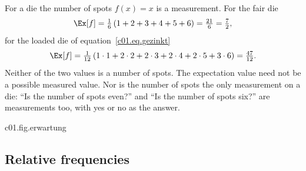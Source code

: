 \begin{example}\label{c01.ex.augenzahl}
  For a die the number of spots $f(x) = x$ is a measurement. For the fair die
  \begin{equation}\label{c01.eq.augenzahl-fair}
    \Ex[f] = \tfrac16\,(1 + 2 + 3 + 4 + 5 + 6) = \tfrac{21}{6} = \tfrac72 ,
  \end{equation}
  for the loaded die of equation~\eqref{c01.eq.gezinkt}
  \begin{equation}\label{c01.eq.augenzahl-gezinkt}
    \Ex[f] = \tfrac{1}{12}\,(1\cdot 1 + 2\cdot 2 + 2\cdot 3 + 2\cdot 4 + 2\cdot 5 + 3\cdot 6)
           = \tfrac{47}{12} .
  \end{equation}
  Neither of the two values is a number of spots. The expectation value need not be a
  possible measured value. Nor is the number of spots the only measurement on a die: “Is
  the number of spots even?” and “Is the number of spots six?” are measurements too, with
  yes or no as the answer.
\end{example}

\begin{tpcfigure}{c01.fig.erwartung}

  \caption{The expectation value of the number of spots as a centre of mass. If one thinks
    of the weights $\pw(x)$ as masses at the places $x$ of a beam, then $\Ex[f]$ is the
    place at which the beam balances: (a) for the fair die in the middle, at
    $\tfrac72$; (b) for the loaded die of equation~\eqref{c01.eq.gezinkt} shifted to the
    right, at $\tfrac{47}{12}$.}
\end{tpcfigure}

\subsection{Relative frequencies}\label{c01.s2.1}


